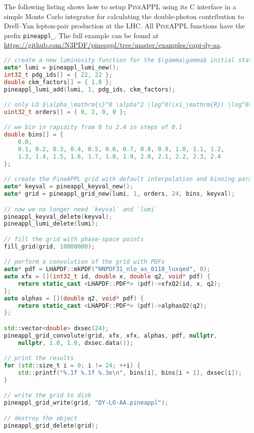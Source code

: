 
The following listing shows how to setup \textsc{PineAPPL} using its C interface in a simple Monte Carlo integrator for calculating the double-photon contribution to Drell--Yan lepton-pair production at the LHC.
All \textsc{PineAPPL} functions have the prefix \texttt{pineappl\_}.
The full example can be found at \url{https://github.com/N3PDF/pineappl/tree/master/examples/capi-dy-aa}.

\begin{lstlisting}[language=C++,mathescape=true]
// create a new luminosity function for the $\gamma\gamma$ initial state
auto* lumi = pineappl_lumi_new();
int32_t pdg_ids[] = { 22, 22 };
double ckm_factors[] = { 1.0 };
pineappl_lumi_add(lumi, 1, pdg_ids, ckm_factors);

// only LO $\alpha_\mathrm{s}^0 \alpha^2 \log^0(\xi_\mathrm{R}) \log^0(\xi_\mathrm{F})$
uint32_t orders[] = { 0, 2, 0, 0 };

// we bin in rapidity from 0 to 2.4 in steps of 0.1
double bins[] = {
    0.0,
    0.1, 0.2, 0.3, 0.4, 0.5, 0.6, 0.7, 0.8, 0.9, 1.0, 1.1, 1.2,
    1.3, 1.4, 1.5, 1.6, 1.7, 1.8, 1.9, 2.0, 2.1, 2.2, 2.3, 2.4
};

// create the PineAPPL grid with default interpolation and binning parameters
auto* keyval = pineappl_keyval_new();
auto* grid = pineappl_grid_new(lumi, 1, orders, 24, bins, keyval);

// now we no longer need `keyval` and `lumi`
pineappl_keyval_delete(keyval);
pineappl_lumi_delete(lumi);

// fill the grid with phase-space points
fill_grid(grid, 10000000);

// perform a convolution of the grid with PDFs
auto* pdf = LHAPDF::mkPDF("NNPDF31_nlo_as_0118_luxqed", 0);
auto xfx = [](int32_t id, double x, double q2, void* pdf) {
    return static_cast <LHAPDF::PDF*> (pdf)->xfxQ2(id, x, q2);
};
auto alphas = [](double q2, void* pdf) {
    return static_cast <LHAPDF::PDF*> (pdf)->alphasQ2(q2);
};

std::vector<double> dxsec(24);
pineappl_grid_convolute(grid, xfx, xfx, alphas, pdf, nullptr,
    nullptr, 1.0, 1.0, dxsec.data());

// print the results
for (std::size_t i = 0; i != 24; ++i) {
    std::printf("%.1f %.1f %.3e\n", bins[i], bins[i + 1], dxsec[i]);
}

// write the grid to disk
pineappl_grid_write(grid, "DY-LO-AA.pineappl");

// destroy the object
pineappl_grid_delete(grid);
\end{lstlisting}
